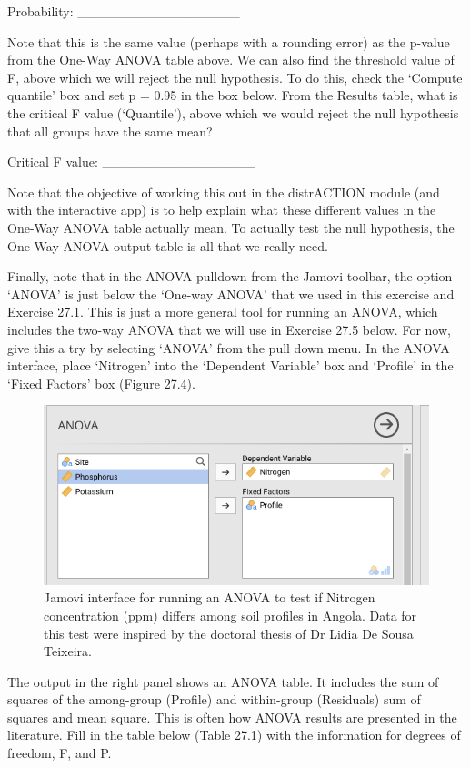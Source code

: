 \documentclass[
]{scrbook}
\begin{document}
Probability: \_\_\_\_\_\_\_\_\_\_\_\_\_\_\_\_\_

Note that this is the same value (perhaps with a rounding error) as the p-value from the One-Way ANOVA table above.
We can also find the threshold value of F, above which we will reject the null hypothesis.
To do this, check the `Compute quantile' box and set p = 0.95 in the box below.
From the Results table, what is the critical F value (`Quantile'), above which we would reject the null hypothesis that all groups have the same mean?

Critical F value: \_\_\_\_\_\_\_\_\_\_\_\_\_\_\_\_

Note that the objective of working this out in the distrACTION module (and with the interactive app) is to help explain what these different values in the One-Way ANOVA table actually mean.
To actually test the null hypothesis, the One-Way ANOVA output table is all that we really need.

Finally, note that in the ANOVA pulldown from the Jamovi toolbar, the option `ANOVA' is just below the `One-way ANOVA' that we used in this exercise and Exercise 27.1.
This is just a more general tool for running an ANOVA, which includes the two-way ANOVA that we will use in Exercise 27.5 below.
For now, give this a try by selecting `ANOVA' from the pull down menu.
In the ANOVA interface, place `Nitrogen' into the `Dependent Variable' box and `Profile' in the `Fixed Factors' box (Figure 27.4).

\begin{figure}
\includegraphics[width=1\linewidth]{img/jamovi_ANOVA_input} \caption{Jamovi interface for running an ANOVA to test if Nitrogen concentration (ppm) differs among soil profiles in Angola. Data for this test were inspired by the doctoral thesis of Dr Lidia De Sousa Teixeira.}\label{fig:unnamed-chunk-128}
\end{figure}

The output in the right panel shows an ANOVA table.
It includes the sum of squares of the among-group (Profile) and within-group (Residuals) sum of squares and mean square.
This is often how ANOVA results are presented in the literature.
Fill in the table below (Table 27.1) with the information for degrees of freedom, F, and P.
\end{document}

